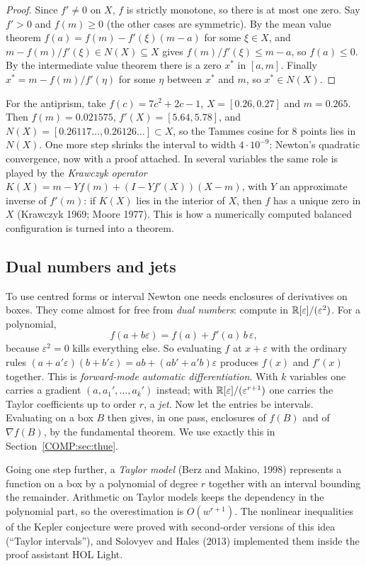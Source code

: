 \begin{proof}
Since $f'\ne0$ on $X$, $f$ is strictly monotone, so there is at most one zero. Say $f'>0$ and $f(m)\ge0$ (the
other cases are symmetric). By the mean value theorem $f(a)=f(m)-f'(\xi)(m-a)$ for some $\xi\in X$, and
$m-f(m)/f'(\xi)\in N(X)\subseteq X$ gives $f(m)/f'(\xi)\le m-a$, so $f(a)\le0$. By the intermediate value
theorem there is a zero $x^*$ in $[a,m]$. Finally $x^*=m-f(m)/f'(\eta)$ for some $\eta$ between $x^*$ and $m$,
so $x^*\in N(X)$.
\end{proof}

For the antiprism, take $f(c)=7c^2+2c-1$, $X=[0.26,0.27]$ and $m=0.265$. Then $f(m)=0.021575$,
$f'(X)=[5.64,5.78]$, and $N(X)=[0.26117\ldots,0.26126\ldots]\subset X$, so the Tammes cosine for $8$ points
lies in $N(X)$. One more step shrinks the interval to width $4\cdot10^{-9}$: Newton's quadratic convergence,
now with a proof attached. In several variables the same role is played by the \emph{Krawczyk operator}
$K(X)=m-Yf(m)+(I-Yf'(X))(X-m)$, with $Y$ an approximate inverse of $f'(m)$: if $K(X)$ lies in the interior of
$X$, then $f$ has a unique zero in $X$ (Krawczyk 1969; Moore 1977). This is how a numerically computed
balanced configuration is turned into a theorem.

\subsection{Dual numbers and jets}
To use centred forms or interval Newton one needs enclosures of derivatives on boxes. They come almost for
free from \emph{dual numbers}: compute in $\mathbb{R}[\varepsilon]/(\varepsilon^2)$. For a polynomial,
\[
  f(a+b\varepsilon)=f(a)+f'(a)\,b\,\varepsilon,
\]
because $\varepsilon^2=0$ kills everything else. So evaluating $f$ at $x+\varepsilon$ with the ordinary rules
$(a+a'\varepsilon)(b+b'\varepsilon)=ab+(ab'+a'b)\varepsilon$ produces $f(x)$ and $f'(x)$ together. This is
\emph{forward-mode automatic differentiation}. With $k$ variables one carries a gradient
$(a,a_1',\dots,a_k')$ instead; with $\mathbb{R}[\varepsilon]/(\varepsilon^{r+1})$ one carries the Taylor coefficients
up to order $r$, a \emph{jet}. Now let the entries be intervals. Evaluating on a box $B$ then gives, in one
pass, enclosures of $f(B)$ and of $\nabla f(B)$, by the fundamental theorem. We use exactly this in
Section~\ref{COMP:sec:thue}.

Going one step further, a \emph{Taylor model} (Berz and Makino, 1998) represents a function on a box by a
polynomial of degree $r$ together with an interval bounding the remainder. Arithmetic on Taylor models
keeps the dependency in the polynomial part, so the overestimation is $O(w^{r+1})$. The nonlinear inequalities
of the Kepler conjecture were proved with second-order versions of this idea (``Taylor intervals''), and
Solovyev and Hales (2013) implemented them inside the proof assistant HOL Light.

